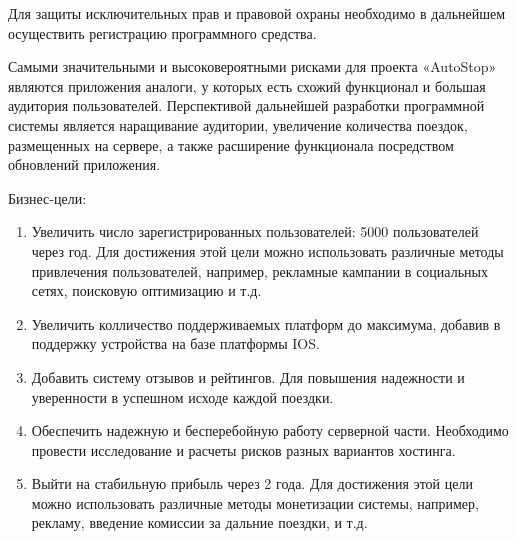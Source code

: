 Для защиты исключительных прав и правовой охраны необходимо в дальнейшем осуществить регистрацию программного средства.

Самыми значительными и высоковероятными рисками для проекта «AutoStop» являются приложения аналоги, у которых есть схожий функционал и большая аудитория пользователей. Перспективой дальнейшей разработки программной системы является наращивание аудитории, увеличение количества поездок, размещенных на сервере, а также расширение функционала посредством обновлений приложения.

Бизнес-цели:

\begin{enumerate}
\item Увеличить число зарегистрированных пользователей: 5000 пользователей через год. Для достижения этой цели можно использовать различные методы привлечения пользователей, например, рекламные кампании в
социальных сетях, поисковую оптимизацию и т.д.
\item Увеличить колличество поддерживаемых платформ до максимума, добавив в поддержку устройства на базе платформы IOS.
\item Добавить систему отзывов и рейтингов. Для повышения надежности и уверенности в успешном исходе каждой поездки.
\item Обеспечить надежную и бесперебойную работу серверной части. Необходимо провести исследование и расчеты рисков разных вариантов хостинга.
\item Выйти на стабильную прибыль через 2 года. Для достижения этой цели можно использовать различные методы монетизации системы, например, рекламу, введение комиссии за дальние поездки, и т.д.
\end{enumerate}